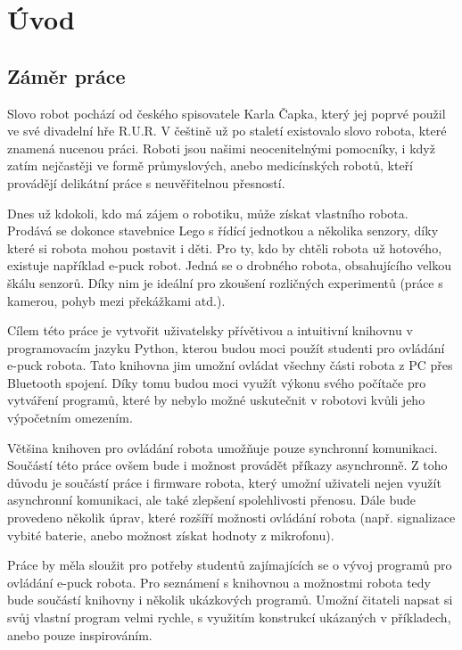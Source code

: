 \documentclass[12pt,notitlepage]{report}
\begin{document}
\newpage

\chapter{Úvod} %

    \section{Záměr práce}

    Slovo robot pochází od českého spisovatele Karla Čapka, který jej poprvé
    použil ve své divadelní hře R.U.R. V češtině už po staletí existovalo slovo
    robota, které znamená nucenou práci. Roboti jsou našimi neocenitelnými
    pomocníky, i když zatím nejčastěji ve formě průmyslových, anebo
    medicínských robotů, kteří provádějí delikátní práce s neuvěřitelnou
    přesností.

    Dnes už kdokoli, kdo má zájem o robotiku, může získat vlastního robota.
    Prodává se dokonce stavebnice Lego s řídící jednotkou a několika senzory,
    díky které si robota mohou postavit i děti. Pro ty, kdo by chtěli robota už
    hotového, existuje například e-puck robot. Jedná se o drobného robota,
    obsahujícího velkou škálu senzorů. Díky nim je ideální pro zkoušení
    rozličných experimentů (práce s kamerou, pohyb mezi překážkami atd.).

    Cílem této práce je vytvořit uživatelsky přívětivou a intuitivní knihovnu v
    programovacím jazyku Python, kterou budou moci použít studenti pro ovládání
    e-puck robota. Tato knihovna jim umožní ovládat všechny části robota z PC
    přes Bluetooth spojení. Díky tomu budou moci využít výkonu svého počítače
    pro vytváření programů, které by nebylo možné uskutečnit v robotovi kvůli
    jeho výpočetním omezením.

    Většina knihoven pro ovládání robota umožňuje pouze synchronní komunikaci.
    Součástí této práce ovšem bude i možnost provádět příkazy asynchronně. Z
    toho důvodu je součástí práce i firmware robota, který umožní uživateli
    nejen využít asynchronní komunikaci, ale také zlepšení spolehlivosti
    přenosu. Dále bude provedeno několik úprav, které rozšíří možnosti ovládání
    robota (např. signalizace vybité baterie, anebo možnost získat hodnoty z
    mikrofonu).

    Práce by měla sloužit pro potřeby studentů zajímajících se o vývoj
    programů pro ovládání e-puck robota. Pro seznámení s knihovnou a možnostmi
    robota tedy bude součástí knihovny i několik ukázkových programů. Umožní
    čitateli napsat si svůj vlastní program velmi rychle, s využitím konstrukcí
    ukázaných v příkladech, anebo pouze inspirováním.
\end{document}
